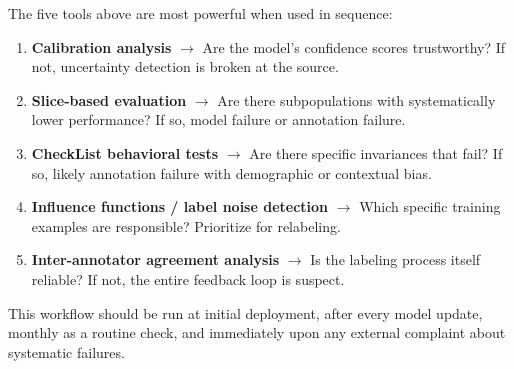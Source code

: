 The five tools above are most powerful when used in sequence:

\begin{enumerate}
    \item \textbf{Calibration analysis} $\to$ Are the model's confidence scores trustworthy? If not, uncertainty detection is broken at the source.
    \item \textbf{Slice-based evaluation} $\to$ Are there subpopulations with systematically lower performance? If so, model failure or annotation failure.
    \item \textbf{CheckList behavioral tests} $\to$ Are there specific invariances that fail? If so, likely annotation failure with demographic or contextual bias.
    \item \textbf{Influence functions / label noise detection} $\to$ Which specific training examples are responsible? Prioritize for relabeling.
    \item \textbf{Inter-annotator agreement analysis} $\to$ Is the labeling process itself reliable? If not, the entire feedback loop is suspect.
\end{enumerate}

This workflow should be run at initial deployment, after every model update, monthly as a routine check, and immediately upon any external complaint about systematic failures.
\apxnumoff
